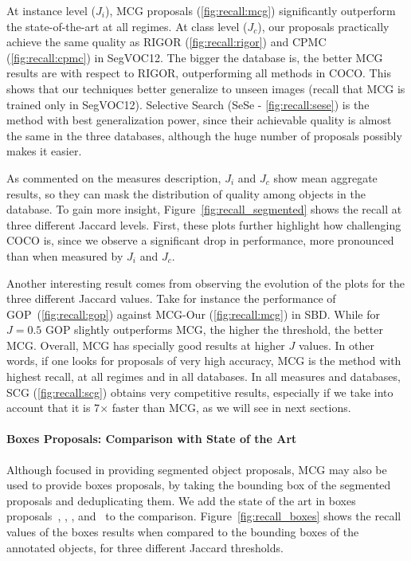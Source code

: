 \documentclass[10pt,journal,cspaper,compsoc]{IEEEtran}
\begin{document}
At instance level ($J_i$), MCG proposals (\ref{fig:recall:mcg}) significantly outperform the state-of-the-art at all regimes.
At class level ($J_c$), our proposals practically achieve the same quality as RIGOR (\ref{fig:recall:rigor}) and CPMC (\ref{fig:recall:cpmc}) in SegVOC12.
The bigger the database is, the better MCG results are with respect to RIGOR, outperforming all methods in COCO.
This shows that our techniques better generalize to unseen images
(recall that MCG is trained only in SegVOC12).
Selective Search (SeSe - \ref{fig:recall:sese}) is the method with best generalization power,
since their achievable quality is almost the same in the three databases,
although the huge number of proposals possibly makes it easier.

As commented on the measures description, $J_i$ and $J_c$ show mean aggregate results, so they can mask
the distribution of quality among objects in the database.
To gain more insight, Figure~\ref{fig:recall_segmented} shows the recall at three different Jaccard levels.
First, these plots further highlight how challenging COCO is, since we observe a significant drop in performance,
more pronounced than when measured by $J_i$ and $J_c$.

Another interesting result comes from observing the evolution of the plots for the three different Jaccard values.
Take for instance the performance of GOP~(\ref{fig:recall:gop}) against MCG-Our (\ref{fig:recall:mcg}) in SBD.
While for $J\!=\!0.5$ GOP slightly outperforms MCG, the higher the threshold, the better MCG.
Overall, MCG has specially good results at higher $J$ values.
In other words, if one looks for proposals of very high accuracy, MCG is the method with highest recall,
at all regimes and in all databases.
In all measures and databases, SCG (\ref{fig:recall:scg}) obtains very competitive results, especially if we take into account that it is 7$\times$ faster than MCG,
as we will see in next sections.

\paragraph*{\textbf{Boxes Proposals: Comparison with State of the Art}}
Although focused in providing segmented object proposals, MCG may also be used to provide boxes proposals, by taking the bounding 
box of the segmented proposals and deduplicating them.
We add the state of the art in boxes proposals~\cite{Zitnick2014}, \cite{Cheng2014}, \cite{Manen2013}, and~\cite{Alexe2012} to the comparison.
Figure~\ref{fig:recall_boxes} shows the recall values of the boxes results when compared to the bounding boxes of the annotated objects, for three different
Jaccard thresholds.
\end{document}
